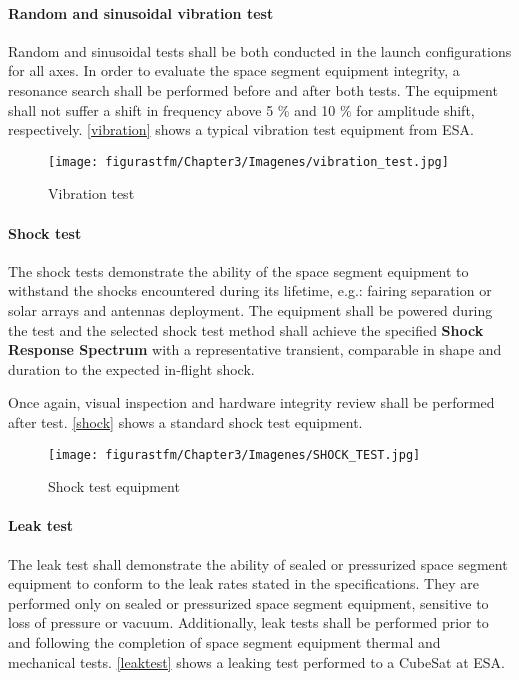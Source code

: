 \paragraph{Random and sinusoidal vibration test}

Random and sinusoidal tests shall be both conducted in the launch configurations for all axes. In order to evaluate the space segment equipment integrity, a resonance search shall be performed before and after both tests. The equipment shall not suffer a shift in frequency above 5 \% and 10 \% for amplitude shift, respectively. \autoref{vibration} shows a typical vibration test equipment from \acrshort{ESA}.

			\begin{figure} [H] 				
				\centering
				\texttt{[image: figurastfm/Chapter3/Imagenes/vibration\_test.jpg]}
				\caption{Vibration test \cite{ESA}} \label{vibration}
			\end{figure}
			
\paragraph{Shock test}

The shock tests demonstrate the ability of the space segment equipment to withstand the shocks encountered during its lifetime, e.g.: fairing separation or solar arrays and antennas deployment. The equipment shall be powered during the test and the selected shock test method shall achieve the specified \textbf{ Shock Response Spectrum }with a representative transient, comparable in shape and duration to the expected in‐flight shock.

Once again, visual inspection and hardware integrity review shall be performed after test. \autoref{shock} shows a standard shock test equipment.

	\begin{figure} [H] 				
				\centering
				\texttt{[image: figurastfm/Chapter3/Imagenes/SHOCK\_TEST.jpg]}
				\caption{Shock test equipment \cite{isispace}} \label{shock}
			\end{figure}

\paragraph{Leak test}

The leak test shall demonstrate the ability of sealed or pressurized space segment equipment to conform to the leak rates stated in the specifications. They are performed only on sealed or pressurized space segment equipment, sensitive to loss of pressure or vacuum. Additionally, leak tests shall be performed prior to and following the completion of space segment equipment thermal and mechanical tests. \autoref{leaktest} shows a leaking test performed to a CubeSat at \acrshort{ESA}.

